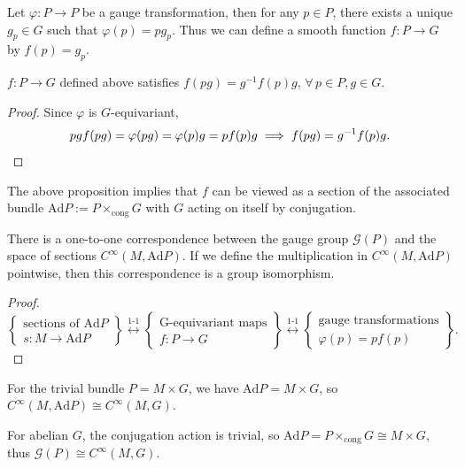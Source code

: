 Let $\varphi: P \to P$ be a gauge transformation, 
then for any $p\in P$, there exists a unique $g_p \in G$ such that $\varphi(p) = p g_p$. 
Thus we can define a smooth function $f: P \to G$ by $f(p) = g_p$.
\begin{proposition}
    $f:P\to G$ defined above satisfies $f(pg) = g^{-1}f(p)g,\,\forall\,p\in P,g\in G$.
\end{proposition}
\begin{proof}
    Since $\varphi$ is $G$-equivariant, 
    \begin{equation*}
        pgf(pg) = \varphi(pg) = \varphi(p)g = pf(p)g
        \implies f(pg) = g^{-1}f(p)g. \qedhere
    \end{equation*}
\end{proof}
The above proposition implies that $f$ can be viewed as a section of 
the associated bundle $\mathrm{Ad}P := P \times_{\mathrm{cong}} G$ 
with $G$ acting on itself by conjugation. 
\begin{theorem}
    There is a one-to-one correspondence between the gauge group $\mathcal{G}(P)$ and the space of sections $C^{\infty}(M, \mathrm{Ad}P)$. 
    If we define the multiplication in $C^{\infty}(M, \mathrm{Ad}P)$ pointwise, then this correspondence is a group isomorphism.
\end{theorem}
\begin{proof}
    \begin{equation*}
        \left\{
            \begin{array}{c}
                \text{sections of } \mathrm{Ad}P \\[2pt]
                s: M \to \mathrm{Ad}P
            \end{array}
        \right\} \overset{\text{1-1}}{\longleftrightarrow}
        \left\{
            \begin{array}{c}
                \text{G-equivariant maps} \\[2pt]
                f: P \to G
            \end{array}
        \right\} \overset{\text{1-1}}{\longleftrightarrow}
        \left\{
            \begin{array}{c}
                \text{gauge transformations} \\[2pt]
                \varphi(p) = p f(p)
            \end{array}
        \right\}.
    \end{equation*}
\end{proof}
\begin{example}
    For the trivial bundle $P = M \times G$, we have $\mathrm{Ad}P = M \times G$, 
    so $C^{\infty}(M, \mathrm{Ad}P) \cong C^{\infty}(M,G)$. 
\end{example}
\begin{example}
    For abelian $G$, the conjugation action is trivial, 
    so $\mathrm{Ad}P = P \times_{\mathrm{cong}} G \cong M \times G$, 
    thus $\mathcal{G}(P) \cong C^{\infty}(M,G)$.
\end{example}
